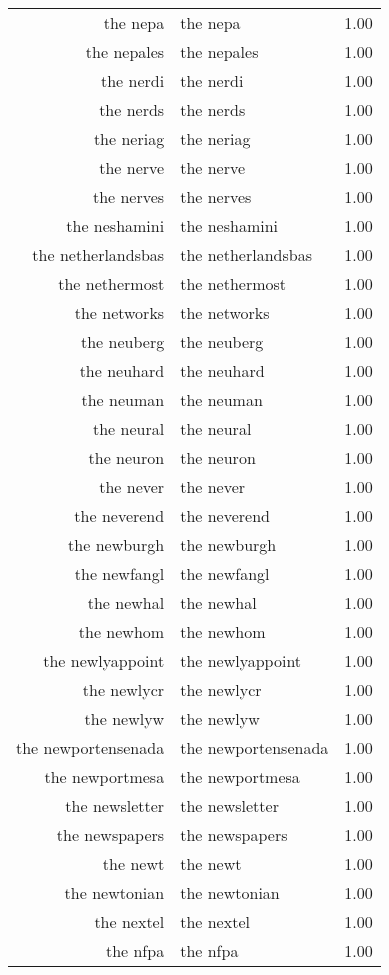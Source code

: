 \begin{table}[ht]
\begin{tabular}{rlr}
  the nepa & the nepa & 1.00 \\ 
  the nepales & the nepales & 1.00 \\ 
  the nerdi & the nerdi & 1.00 \\ 
  the nerds & the nerds & 1.00 \\ 
  the neriag & the neriag & 1.00 \\ 
  the nerve & the nerve & 1.00 \\ 
  the nerves & the nerves & 1.00 \\ 
  the neshamini & the neshamini & 1.00 \\ 
  the netherlandsbas & the netherlandsbas & 1.00 \\ 
  the nethermost & the nethermost & 1.00 \\ 
  the networks & the networks & 1.00 \\ 
  the neuberg & the neuberg & 1.00 \\ 
  the neuhard & the neuhard & 1.00 \\ 
  the neuman & the neuman & 1.00 \\ 
  the neural & the neural & 1.00 \\ 
  the neuron & the neuron & 1.00 \\ 
  the never & the never & 1.00 \\ 
  the neverend & the neverend & 1.00 \\ 
  the newburgh & the newburgh & 1.00 \\ 
  the newfangl & the newfangl & 1.00 \\ 
  the newhal & the newhal & 1.00 \\ 
  the newhom & the newhom & 1.00 \\ 
  the newlyappoint & the newlyappoint & 1.00 \\ 
  the newlycr & the newlycr & 1.00 \\ 
  the newlyw & the newlyw & 1.00 \\ 
  the newportensenada & the newportensenada & 1.00 \\ 
  the newportmesa & the newportmesa & 1.00 \\ 
  the newsletter & the newsletter & 1.00 \\ 
  the newspapers & the newspapers & 1.00 \\ 
  the newt & the newt & 1.00 \\ 
  the newtonian & the newtonian & 1.00 \\ 
  the nextel & the nextel & 1.00 \\ 
  the nfpa & the nfpa & 1.00 \\ 

\end{tabular}
\end{table}
